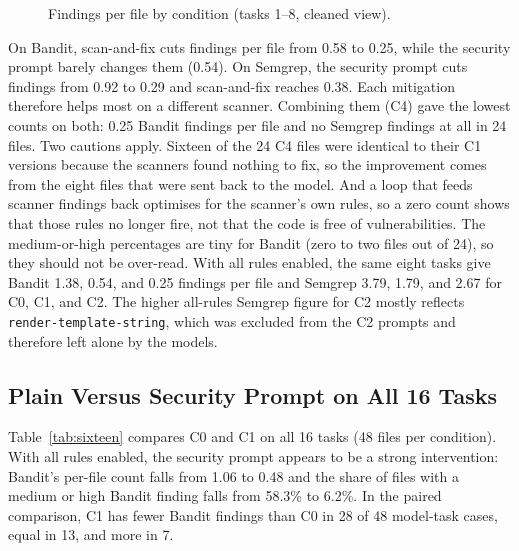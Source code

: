 \documentclass[conference]{IEEEtran}
\begin{document}
\begin{figure}[t]
\centering
{}
\caption{Findings per file by condition (tasks 1--8, cleaned view).}
\label{fig:main}
\end{figure}

On Bandit, scan-and-fix cuts findings per file from 0.58 to 0.25, while the security prompt barely changes them (0.54). On Semgrep, the security prompt cuts findings from 0.92 to 0.29 and scan-and-fix reaches 0.38. Each mitigation therefore helps most on a different scanner. Combining them (C4) gave the lowest counts on both: 0.25 Bandit findings per file and no Semgrep findings at all in 24 files. Two cautions apply. Sixteen of the 24 C4 files were identical to their C1 versions because the scanners found nothing to fix, so the improvement comes from the eight files that were sent back to the model. And a loop that feeds scanner findings back optimises for the scanner's own rules, so a zero count shows that those rules no longer fire, not that the code is free of vulnerabilities. The medium-or-high percentages are tiny for Bandit (zero to two files out of 24), so they should not be over-read. With all rules enabled, the same eight tasks give Bandit 1.38, 0.54, and 0.25 findings per file and Semgrep 3.79, 1.79, and 2.67 for C0, C1, and C2. The higher all-rules Semgrep figure for C2 mostly reflects \texttt{render-template-string}, which was excluded from the C2 prompts and therefore left alone by the models.

\subsection{Plain Versus Security Prompt on All 16 Tasks}
Table~\ref{tab:sixteen} compares C0 and C1 on all 16 tasks (48 files per condition). With all rules enabled, the security prompt appears to be a strong intervention: Bandit's per-file count falls from 1.06 to 0.48 and the share of files with a medium or high Bandit finding falls from 58.3\% to 6.2\%. In the paired comparison, C1 has fewer Bandit findings than C0 in 28 of 48 model-task cases, equal in 13, and more in 7.
\end{document}
